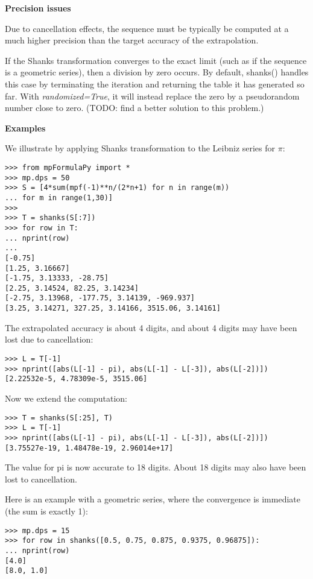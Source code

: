 \vpara
\textbf{Precision issues}

Due to cancellation effects, the sequence must be typically be computed at a much higher precision than the target accuracy of the extrapolation.

If the Shanks transformation converges to the exact limit (such as if the sequence is a geometric series), then a division by zero occurs. By default, shanks() handles this case by terminating the iteration and returning the table it has generated so far. With \textit{randomized=True}, it will instead replace the zero by a pseudorandom number close to
zero. (TODO: find a better solution to this problem.)

\vpara
\textbf{Examples}

We illustrate by applying Shanks transformation to the Leibniz series for $\pi$:

\begin{lstlisting}
>>> from mpFormulaPy import *
>>> mp.dps = 50
>>> S = [4*sum(mpf(-1)**n/(2*n+1) for n in range(m))
... for m in range(1,30)]
>>>
>>> T = shanks(S[:7])
>>> for row in T:
... nprint(row)
...
[-0.75]
[1.25, 3.16667]
[-1.75, 3.13333, -28.75]
[2.25, 3.14524, 82.25, 3.14234]
[-2.75, 3.13968, -177.75, 3.14139, -969.937]
[3.25, 3.14271, 327.25, 3.14166, 3515.06, 3.14161]
\end{lstlisting}

The extrapolated accuracy is about 4 digits, and about 4 digits may have been lost due to cancellation:

\begin{lstlisting}
>>> L = T[-1]
>>> nprint([abs(L[-1] - pi), abs(L[-1] - L[-3]), abs(L[-2])])
[2.22532e-5, 4.78309e-5, 3515.06]
\end{lstlisting}

Now we extend the computation:

\begin{lstlisting}
>>> T = shanks(S[:25], T)
>>> L = T[-1]
>>> nprint([abs(L[-1] - pi), abs(L[-1] - L[-3]), abs(L[-2])])
[3.75527e-19, 1.48478e-19, 2.96014e+17]
\end{lstlisting}

The value for pi is now accurate to 18 digits. About 18 digits may also have been lost to cancellation.

\vpara
Here is an example with a geometric series, where the convergence is immediate (the sum is exactly 1):

\begin{lstlisting}
>>> mp.dps = 15
>>> for row in shanks([0.5, 0.75, 0.875, 0.9375, 0.96875]):
... nprint(row)
[4.0]
[8.0, 1.0]
\end{lstlisting}




